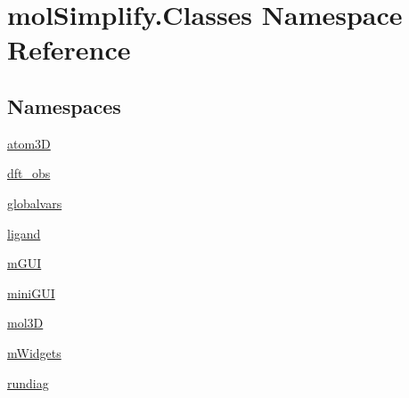 \hypertarget{namespacemolSimplify_1_1Classes}{}\section{mol\+Simplify.\+Classes Namespace Reference}
\label{namespacemolSimplify_1_1Classes}
\subsection*{Namespaces}
\begin{DoxyCompactItemize}
\item 
 \hyperlink{namespacemolSimplify_1_1Classes_1_1atom3D}{atom3D}
\item 
 \hyperlink{namespacemolSimplify_1_1Classes_1_1dft__obs}{dft\+\_\+obs}
\item 
 \hyperlink{namespacemolSimplify_1_1Classes_1_1globalvars}{globalvars}
\item 
 \hyperlink{namespacemolSimplify_1_1Classes_1_1ligand}{ligand}
\item 
 \hyperlink{namespacemolSimplify_1_1Classes_1_1mGUI}{m\+G\+UI}
\item 
 \hyperlink{namespacemolSimplify_1_1Classes_1_1miniGUI}{mini\+G\+UI}
\item 
 \hyperlink{namespacemolSimplify_1_1Classes_1_1mol3D}{mol3D}
\item 
 \hyperlink{namespacemolSimplify_1_1Classes_1_1mWidgets}{m\+Widgets}
\item 
 \hyperlink{namespacemolSimplify_1_1Classes_1_1rundiag}{rundiag}
\end{DoxyCompactItemize}

